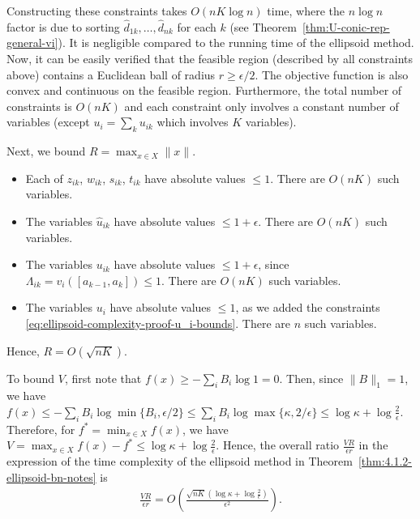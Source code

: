 Constructing these constraints takes $O(nK\log n)$ time, where the $n\log n$ factor is due to sorting $\hat{d}_{1k}, \dots, \hat{d}_{nk}$ for each $k$ (see Theorem~\ref{thm:U-conic-rep-general-vi}). It is negligible compared to the running time of the ellipsoid method. 
Now, it can be easily verified that the feasible region (described by all constraints above) contains a Euclidean ball of radius $r \geq \epsilon/2$. The objective function is also convex and continuous on the feasible region. Furthermore, the total number of constraints is $O(nK)$ and each constraint only involves a constant number of variables (except $u_i = \sum_k u_{ik}$ which involves $K$ variables).

Next, we bound $R = \max_{x\in X} \|x\|$. 
\begin{itemize}
	\item Each of $z_{ik}$, $w_{ik}$, $s_{ik}$, $t_{ik}$ have absolute values $\leq 1$. There are $O(nK)$ such variables. 
	\item The variables $\hat{u}_{ik}$ have absolute values $\leq 1+\epsilon$. There are $O(nK)$ such variables. 
	\item The variables $u_{ik}$ have absolute values $\leq 1+\epsilon$, since $\Lambda_{ik} = v_i([a_{k-1}, a_k]) \leq 1$. There are $O(nK)$ such variables. 
	\item The variables $u_i$ have absolute values $\leq 1$, as we added the constraints \eqref{eq:ellipsoid-complexity-proof-u_i-bounds}. There are $n$ such variables.
\end{itemize}
Hence, $R = O(\sqrt{nK})$.

To bound $V$, first note that 
$f(x) \geq -\sum_i B_i \log 1 = 0$.
Then, since $\|B\|_1 = 1$, we have
$f(x) \leq -\sum_i B_i \log \min\{ B_i, \epsilon/2 \} \leq \sum_i B_i \log \max\{\kappa, 2/\epsilon \} \leq \log \kappa + \log \frac{2}{\epsilon}$.
Therefore, for $f^* = \min_{x\in X} f(x)$, we have $V = \max_{x\in X}f(x) - f^* \leq \log \kappa + \log \frac{2}{\epsilon}$. Hence, the overall ratio $\frac{VR}{\epsilon r}$ in the expression of the time complexity of the ellipsoid method in Theorem~\ref{thm:4.1.2-ellipsoid-bn-notes} is
\begin{align}
	\frac{VR}{\epsilon r} = O\left( \frac{\sqrt{nK} \left( \log \kappa + \log \frac{2}{\epsilon} \right) }{\epsilon^2} \right).
	\label{eq:ellipsoid-ratio-VR/eps*r}
\end{align}

